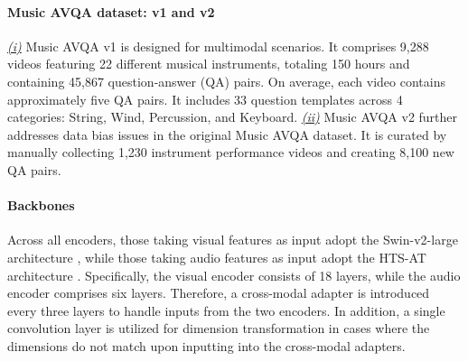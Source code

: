 \documentclass[11pt]{article}
\begin{document}
\paragraph{Music AVQA dataset: v1 and v2}
\underline{\textit{(i)}} Music AVQA v1 \cite{li2022learning} is designed for multimodal scenarios. It comprises 9,288 videos featuring 22 different musical instruments, totaling 150 hours and containing 45,867 question-answer (QA) pairs. On average, each video contains approximately five QA pairs. 
It includes 33 question templates across 4 categories: String, Wind, Percussion, and Keyboard.
\underline{\textit{(ii)}} Music AVQA v2 \cite{liu2024tackling} further addresses data bias issues in the original Music AVQA dataset. It is curated by manually collecting 1,230 instrument performance videos and creating 8,100 new QA pairs. 

\paragraph{Backbones}
Across all encoders, those taking visual features as input adopt the Swin-v2-large architecture \cite{liu2022swin}, while those taking audio features as input adopt the HTS-AT architecture \cite{chen2022hts}. 
Specifically, the visual encoder consists of 18 layers, while the audio encoder comprises six layers. 
Therefore, a cross-modal adapter is introduced every three layers to handle inputs from the two encoders. 
In addition, a single convolution layer is utilized for dimension transformation in cases where the dimensions do not match upon inputting into the cross-modal adapters. 
\end{document}
